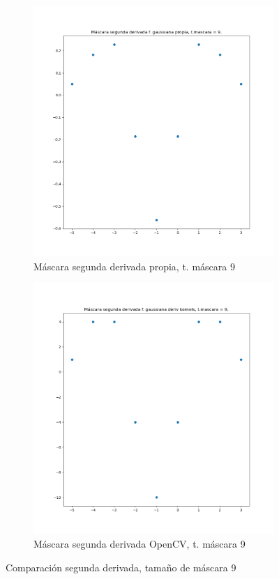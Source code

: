 \documentclass[12pt, spanish]{article}
\begin{document}
\begin{figure}[H]
  \centering
	\begin{subfigure}[t]{0.4\textwidth}
		\centering
		\includegraphics[width = \textwidth]{cmp-2p9.png}
 		 \caption{Máscara segunda derivada propia, t. máscara 9}
	\end{subfigure}
	\hspace{1cm}
	\begin{subfigure}[t]{0.4\textwidth}
		\centering
		\includegraphics[width = \textwidth]{cmp-2cv9.png}
 		 \caption{Máscara segunda derivada OpenCV, t. máscara 9}
	\end{subfigure}
	\caption{Comparación segunda derivada, tamaño de máscara 9}

  	\label{fig:ej1c5}
\end{figure}
\end{document}
